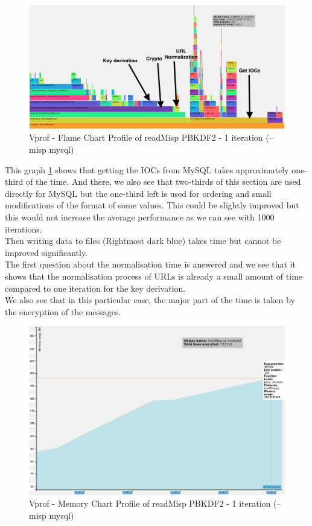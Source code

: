 \documentclass{eplmastersthesis}
\begin{document}
\begin{figure}[h!]
\begin{center}
	\includegraphics[scale=0.3]{res/profile-1iter}
	\caption{Vprof - Flame Chart Profile of readMisp PBKDF2 - 1 iteration (--misp mysql)}
	\label{profile-readMisp}
\end{center}
\end{figure}

This graph \ref{profile-readMisp} shows that getting the IOCs from MySQL takes approximately one-third of the time. And there, we also see that two-thirds of this section are used directly for MySQL but the one-third left is used for ordering and small modifications of the format of some values. This could be slightly improved but this would not increase the average performance as we can see with 1000 iterations.\\
Then writing data to files (Rightmost dark blue) takes time but cannot be improved significantly.\\  
The first question about the normalisation time is answered and we see that it shows that the normalisation process of URLs is already a small amount of time compared to one iteration for the key derivation.\\
We also see that in this particular case, the major part of the time is taken by the encryption of the messages.

\begin{figure}[h!]
\begin{center}
	\includegraphics[scale=0.3]{res/profile-mem-readMisp-1iter}
	\caption{Vprof - Memory Chart Profile of readMisp PBKDF2 - 1 iteration (--misp mysql)}
	\label{profile-mem-readMisp}
\end{center}
\end{figure}
\end{document}
